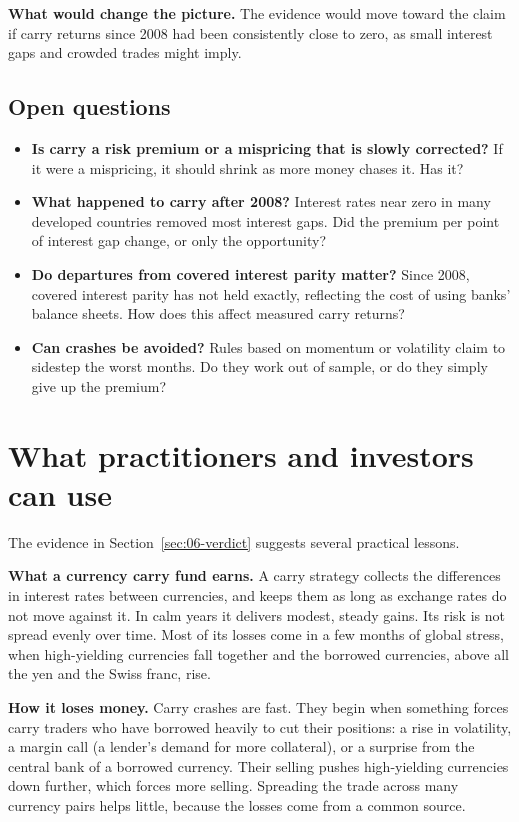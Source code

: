 \textbf{What would change the picture.} The evidence would move toward the claim if carry returns since 2008 had been consistently close to zero, as small interest gaps and crowded trades might imply.

\subsection{Open questions}
\label{sec:06-open}

\begin{itemize}
  \item \textbf{Is carry a risk premium or a mispricing that is slowly corrected?} If it were a mispricing, it should shrink as more money chases it. Has it?
  \item \textbf{What happened to carry after 2008?} Interest rates near zero in many developed countries removed most interest gaps. Did the premium per point of interest gap change, or only the opportunity?
  \item \textbf{Do departures from covered interest parity matter?} Since 2008, covered interest parity has not held exactly, reflecting the cost of using banks' balance sheets. How does this affect measured carry returns?
  \item \textbf{Can crashes be avoided?} Rules based on momentum or volatility claim to sidestep the worst months. Do they work out of sample, or do they simply give up the premium?
\end{itemize}

\section{What practitioners and investors can use}
\label{sec:06-investors}

The evidence in Section~\ref{sec:06-verdict} suggests several practical lessons.

\textbf{What a currency carry fund earns.} A carry strategy collects the differences in interest rates between currencies, and keeps them as long as exchange rates do not move against it. In calm years it delivers modest, steady gains. Its risk is not spread evenly over time. Most of its losses come in a few months of global stress, when high-yielding currencies fall together and the borrowed currencies, above all the yen and the Swiss franc, rise.

\textbf{How it loses money.} Carry crashes are fast. They begin when something forces carry traders who have borrowed heavily to cut their positions: a rise in volatility, a margin call (a lender's demand for more collateral), or a surprise from the central bank of a borrowed currency. Their selling pushes high-yielding currencies down further, which forces more selling. Spreading the trade across many currency pairs helps little, because the losses come from a common source.

